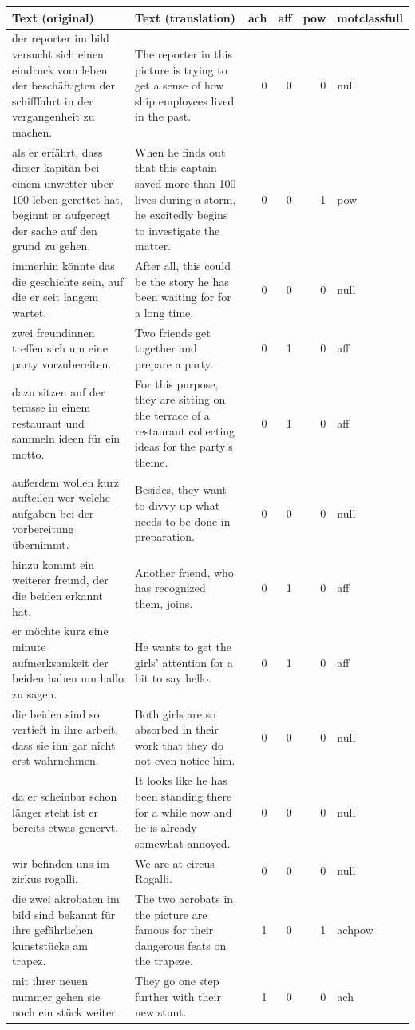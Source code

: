 \documentclass[man,a4paper,mask]{apa6}\usepackage[]{graphicx}\usepackage[]{color}
\begin{document}
\begin{table}
\begin{tabularx}{\textwidth}{XXrrrl}
Text (original) & Text (translation) & ach & aff & pow & motclassfull \\ 
  \hline
der reporter im bild versucht sich einen eindruck vom leben der beschäftigten der schifffahrt in der vergangenheit zu machen. & The reporter in this picture is trying to get a sense of how ship employees lived in the past. &   0 &   0 &   0 & null \\ 
  als er erfährt, dass dieser kapitän bei einem unwetter über 100 leben gerettet hat, beginnt er aufgeregt der sache auf den grund zu gehen. & When he finds out that this captain saved more than 100 lives during a storm, he excitedly begins to investigate the matter. &   0 &   0 &   1 & pow \\ 
  immerhin könnte das die geschichte sein, auf die er seit langem wartet. & After all, this could be the story he has been waiting for for a long time. &   0 &   0 &   0 & null \\ 
  zwei freundinnen treffen sich um eine party vorzubereiten. & Two friends get together and prepare a party. &   0 &   1 &   0 & aff \\ 
  dazu sitzen auf der terasse in einem restaurant und sammeln ideen für ein motto. & For this purpose, they are sitting on the terrace of a restaurant collecting ideas for the party’s theme. &   0 &   1 &   0 & aff \\ 
  außerdem wollen kurz aufteilen wer welche aufgaben bei der vorbereitung übernimmt. & Besides, they want to divvy up what needs to be done in preparation. &   0 &   0 &   0 & null \\ 
  hinzu kommt ein weiterer freund, der die beiden erkannt hat. & Another friend, who has recognized them, joins. &   0 &   1 &   0 & aff \\ 
  er möchte kurz eine minute aufmerksamkeit der beiden haben um hallo zu sagen. & He wants to get the girls’ attention for a bit to say hello. &   0 &   1 &   0 & aff \\ 
  die beiden sind so vertieft in ihre arbeit, dass sie ihn gar nicht erst wahrnehmen. & Both girls are so absorbed in their work that they do not even notice him. &   0 &   0 &   0 & null \\ 
  da er scheinbar schon länger steht ist er bereits etwas genervt. & It looks like he has been standing there for a while now and he is already somewhat annoyed. &   0 &   0 &   0 & null \\ 
  wir befinden uns im zirkus rogalli. & We are at circus Rogalli. &   0 &   0 &   0 & null \\ 
  die zwei akrobaten im bild sind bekannt für ihre gefährlichen kunststücke am trapez. & The two acrobats in the picture are famous for their dangerous feats on the trapeze. &   1 &   0 &   1 & achpow \\ 
  mit ihrer neuen nummer gehen sie noch ein stück weiter. & They go one step further with their new stunt. &   1 &   0 &   0 & ach \\ 
   \hline

		\bottomrule
		\end{tabularx}
\end{table}
\end{document}
